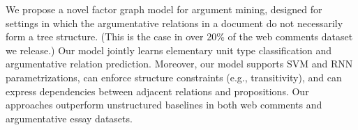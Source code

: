 We propose a novel factor graph model for argument mining, designed for settings in which the argumentative relations in a document do not necessarily form a tree structure. (This is the case in over 20\% of the web comments dataset we release.) Our model jointly learns elementary unit type classification and argumentative relation prediction. Moreover, our model supports SVM and RNN parametrizations, can enforce structure constraints (e.g., transitivity), and can express dependencies between adjacent relations and propositions. Our approaches outperform unstructured baselines in both web comments and argumentative essay datasets.
